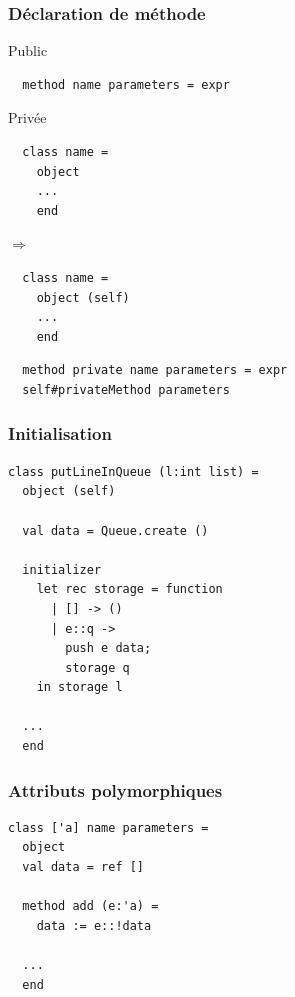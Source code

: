 \begin{frame}[fragile]
	\frametitle{Déclaration de méthode}
	\begin{block}{Public}
		\begin{lstlisting}
  method name parameters = expr
		\end{lstlisting}
	\end{block}
	\begin{block}{Privée}
		\begin{minipage}{0.4\textwidth}
  			\begin{lstlisting}
  class name =
    object
    ...
    end
			\end{lstlisting}
		\end{minipage}$\Rightarrow$
		\begin{minipage}{0.4\textwidth}
			\begin{lstlisting}
  class name =
    object (self)
    ...
    end
			\end{lstlisting}
		\end{minipage}
	\end{block}
	\begin{lstlisting}
  method private name parameters = expr
  self#privateMethod parameters
	\end{lstlisting}
\end{frame}

\begin{frame}[fragile]
	\frametitle{Initialisation}
	\begin{lstlisting}
class putLineInQueue (l:int list) =
  object (self)
    
  val data = Queue.create ()

  initializer
    let rec storage = function
      | [] -> ()
      | e::q -> 
        push e data;
        storage q
    in storage l

  ...
  end
	\end{lstlisting}
\end{frame}

\begin{frame}[fragile]
	\frametitle{Attributs polymorphiques}
	\begin{lstlisting}
class ['a] name parameters =
  object 
  val data = ref []

  method add (e:'a) =
    data := e::!data
  
  ...
  end
	\end{lstlisting}
\end{frame}

